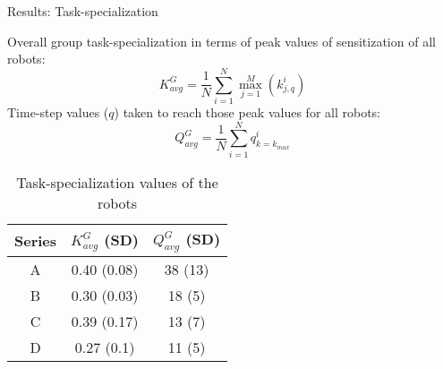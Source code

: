 \documentclass[handout,draft]{beamer}
\begin{document}
\begin{frame}[t]{Results: Task-specialization}
\begin{small}
\alert{Overall group task-specialization} in terms of peak values of sensitization of all robots:
\vspace*{-0.25cm}
\begin{equation}
K^G_{avg} = \frac{1}{N}\sum_{i=1}^{N} \max_{j=1}^M\left ( k^i_{j, q} \right ) 
\label{eqn:K-G}
\end{equation}
Time-step values ($q$) taken to reach those peak values for all robots:
\vspace*{-0.25cm}
\begin{equation}
Q^G_{avg}= \frac{1}{N}\sum_{i=1}^{N} q^i_{k=k_{max}}
\label{eqn:Q-G}
\end{equation}
\end{small}
\vspace*{-0.75cm}
\begin{table}
\begin{small}
\begin{center}
\caption{Task-specialization values of the robots}
\begin{tabular}{|c|c|c|}
\hline Series & \textbf{$ K^G_{avg}$} (SD) & \textbf{$ Q^G_{avg}$} (SD) \\ 
\hline \alert{A} & \alert{0.40} (0.08)& \alert{38} (13)\\ 
\hline B & 0.30 (0.03) & 18 (5)\\
\hline \alert{C}  & \alert{0.39} (0.17) & \alert{13} (7)\\
\hline D  & 0.27 (0.1) & 11 (5)\\
\hline
\end{tabular}
\label{table:motion-cmp} 
\end{center}
\end{small}
\end{table}
\end{frame}
\end{document}
